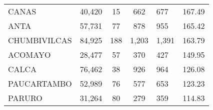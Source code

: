 \begin{tabular}{lrcclr}
	\cellcolor[HTML]{FFFF99}CANAS                                  & 40,420                                                         & 15                                                         & 662                  & 677                                                                 & 167.49                                                                       \\
	\cellcolor[HTML]{FFFF99}ANTA                                   & 57,731                                                         & 77                                                         & 878                  & 955                                                                 & 165.42                                                                       \\
	\cellcolor[HTML]{C6E0B4}CHUMBIVILCAS                           & 84,925                                                         & 188                                                        & 1,203                & 1,391                                                               & 163.79                                                                       \\
	\cellcolor[HTML]{C6E0B4}ACOMAYO                                & 28,477                                                         & 57                                                         & 370                  & 427                                                                 & 149.95                                                                       \\
	\cellcolor[HTML]{C6E0B4}CALCA                                  & 76,462                                                         & 38                                                         & 926                  & 964                                                                 & 126.08                                                                       \\
	\cellcolor[HTML]{C6E0B4}PAUCARTAMBO                            & 52,989                                                         & 76                                                         & 577                  & 653                                                                 & 123.23                                                                       \\
	\cellcolor[HTML]{C6E0B4}PARURO                                 & 31,264                                                         & 80                                                         & 279                  & 359                                                                 & 114.83                                                                       \\

\end{tabular}
